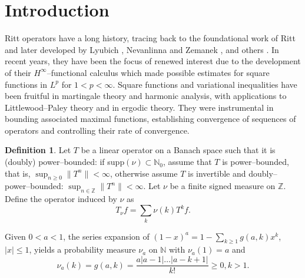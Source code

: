 \documentclass[11pt]{amsart}
\theoremstyle{definition}
\newtheorem{defn}[thm]{Definition} %
\theoremstyle{remark}
\begin{document}
\maketitle



\section{Introduction}


%

Ritt operators have a long history, tracing back to the foundational work of Ritt \cite{Ritt} and later developed by Lyubich \cite{Lyub}, Nevanlinna and Zemanek \cite{Nev,NZ}, and others \cite{Bl}.
In recent years, they have been the focus of renewed interest \cite{A,ALeM,Bl,CCL,Dunn,GT,LeM-H,LeMX-max,LeMX-Vq,HH} due to the development of their $H^{\infty}$--functional calculus which made possible estimates for square functions in $L^p$ for $1<p<\infty$. 
Square functions and variational inequalities have been fruitful in martingale theory and harmonic analysis, with applications to Littlewood--Paley theory and in ergodic theory.  They were instrumental in bounding associated maximal functions, establishing convergence of sequences of operators and controlling their rate of convergence. 




\begin{defn} %
Let $T$ be a linear operator on a Banach space such that it is (doubly) power--bounded: if supp$(\nu)\subset \mathbb N_0$, assume that $T$ is power--bounded, that is, $\sup_{n\ge 0} \lVert T^n\rVert<\infty$, otherwise assume  $T$ is invertible and doubly--power--bounded: $\sup_{n\in \mathbb Z} \lVert T^n\rVert<\infty$.
Let $\nu$ be a finite signed measure on $\mathbb Z$. Define the  operator induced by $\nu$ as
 \begin{equation}T_{\nu}f=\sum_k \nu(k) T^kf.\label{eq:Tmu} \end{equation}
\end{defn}

Given $0<a<1$, the series expansion of
$(1-x)^{a}=1-\sum_{k\ge 1} g(a,k) x^k$, $|x|\le 1$,
yields a probability measure $\nu_{a}$ on $\mathbb N$ with $\nu_{a}(1)=a$ and 
 \begin{equation}\nu_{a}(k)= g(a,k) =\frac{a |a-1| \ldots |a-k+1|}{k!} \ge 0, k>1. \label{eqn:valpha} \end{equation}
\end{document}
